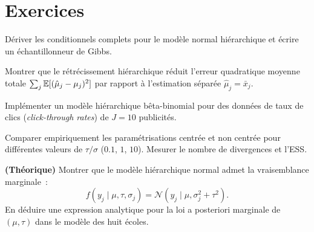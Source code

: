 \section{Exercices}

\begin{exercice}
D\'eriver les conditionnels complets pour le mod\`ele normal
hi\'erarchique et \'ecrire un \'echantillonneur de Gibbs.
\end{exercice}

\begin{exercice}
Montrer que le r\'etr\'ecissement hi\'erarchique r\'eduit l'erreur
quadratique moyenne totale $\sum_j \mathbb{E}[(\hat{\mu}_j - \mu_j)^2]$ par
rapport \`a l'estimation s\'epar\'ee $\hat{\mu}_j = \bar{x}_j$.
\end{exercice}

\begin{exercice}
Impl\'ementer un mod\`ele hi\'erarchique b\^eta-binomial pour des
donn\'ees de taux de clics (\textit{click-through rates}) de $J = 10$
publicit\'es.
\end{exercice}

\begin{exercice}
Comparer empiriquement les param\'etrisations centr\'ee et non centr\'ee
pour diff\'erentes valeurs de $\tau/\sigma$ ($0.1$, $1$, $10$).
Mesurer le nombre de divergences et l'ESS.
\end{exercice}

\begin{exercice}
\textbf{(Th\'eorique)} Montrer que le mod\`ele hi\'erarchique
normal admet la vraisemblance marginale~:
\[
  f(y_j \mid \mu, \tau, \sigma_j)
  = \mathcal{N}(y_j \mid \mu, \sigma_j^2 + \tau^2).
\]
En d\'eduire une expression analytique pour la loi a posteriori
marginale de $(\mu, \tau)$ dans le mod\`ele des huit \'ecoles.
\end{exercice}
